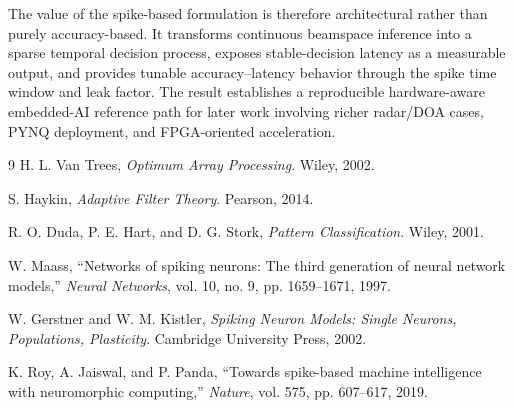 \documentclass[conference]{IEEEtran}
\begin{document}
The value of the spike-based formulation is therefore architectural rather than purely accuracy-based. It transforms continuous beamspace inference into a sparse temporal decision process, exposes stable-decision latency as a measurable output, and provides tunable accuracy--latency behavior through the spike time window and leak factor. The result establishes a reproducible hardware-aware embedded-AI reference path for later work involving richer radar/DOA cases, PYNQ deployment, and FPGA-oriented acceleration.

\begin{thebibliography}{9}
H. L. Van Trees, \emph{Optimum Array Processing}. Wiley, 2002.

S. Haykin, \emph{Adaptive Filter Theory}. Pearson, 2014.

R. O. Duda, P. E. Hart, and D. G. Stork, \emph{Pattern Classification}. Wiley, 2001.

W. Maass, ``Networks of spiking neurons: The third generation of neural network models,'' \emph{Neural Networks}, vol. 10, no. 9, pp. 1659--1671, 1997.

W. Gerstner and W. M. Kistler, \emph{Spiking Neuron Models: Single Neurons, Populations, Plasticity}. Cambridge University Press, 2002.

K. Roy, A. Jaiswal, and P. Panda, ``Towards spike-based machine intelligence with neuromorphic computing,'' \emph{Nature}, vol. 575, pp. 607--617, 2019.
\end{thebibliography}
\end{document}
